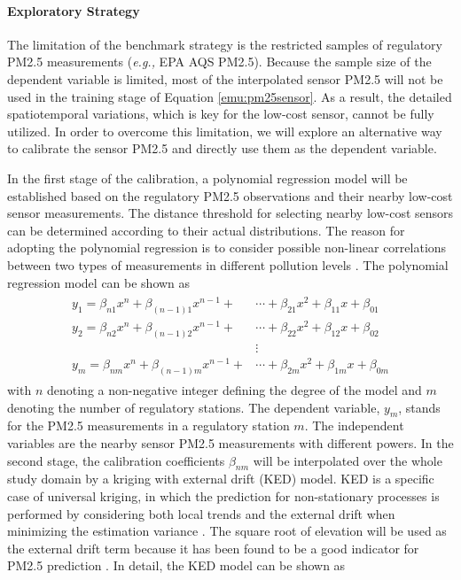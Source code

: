 \documentclass[11pt]{article}
\begin{document}
\paragraph{Exploratory Strategy}
The limitation of the benchmark strategy is the restricted samples of regulatory PM2.5 measurements (\textit{e.g.,} EPA AQS PM2.5). Because the sample size of the dependent variable is limited, most of the interpolated sensor PM2.5 will not be used in the training stage of Equation \ref{emu:pm25sensor}. As a result, the detailed spatiotemporal variations, which is key for the low-cost sensor, cannot be fully utilized. In order to overcome this limitation, we will explore an alternative way to calibrate the sensor PM2.5 and directly use them as the dependent variable. 

In the first stage of the calibration, a polynomial regression model will be established based on the regulatory PM2.5 observations and their nearby low-cost sensor measurements. The distance threshold for selecting nearby low-cost sensors can be determined according to their actual distributions. The reason for adopting the polynomial regression is to consider possible non-linear correlations between two types of measurements in different pollution levels \citep{Kelly2017}. The polynomial regression model can be shown as
\begin{align}
\label{emu:beta}
\begin{split}
y_1=\beta_{n1}x^n+\beta_{(n-1)1}x^{n-1}+&\cdots+\beta_{21}x^2+\beta_{11}x+\beta_{01} \\
y_2=\beta_{n2}x^n+\beta_{(n-1)2}x^{n-1}+&\cdots+\beta_{22}x^2+\beta_{12}x+\beta_{02} \\
&\vdots \\
y_m=\beta_{nm}x^n+\beta_{(n-1)m}x^{n-1}+&\cdots+\beta_{2m}x^2+\beta_{1m}x+\beta_{0m}
\end{split}
\end{align}
with $n$ denoting a non-negative integer defining the degree of the model and $m$ denoting the number of regulatory stations. The dependent variable, $y_m$, stands for the PM2.5 measurements in a regulatory station $m$. The independent variables are the nearby sensor PM2.5 measurements with different powers. In the second stage, the calibration coefficients $\beta_{nm}$ will be interpolated over the whole study domain by a kriging with external drift (KED) model. KED is a specific case of universal kriging, in which the prediction for non-stationary processes is performed by considering both local trends and the external drift when minimizing the estimation variance \citep{Liang2017}. The square root of elevation will be used as the external drift term because it has been found to be a good indicator for PM2.5 prediction \citep{Tunno2016}. In detail, the KED model can be shown as 
\end{document}
